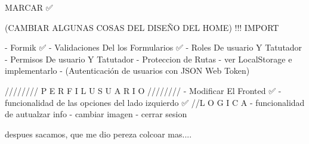
MARCAR ✅

(CAMBIAR ALGUNAS COSAS DEL DISEÑO DEL HOME) !!! IMPORT 

- Formik ✅
- Validaciones Del los Formularios ✅
- Roles De usuario Y Tatutador 
- Permisos De usuario Y Tatutador
- Proteccion de Rutas
- ver LocalStorage e implementarlo
- (Autenticación de usuarios con JSON Web Token)


////////   P E R F I L   U S U A R I O   ////////  
- Modificar El Fronted ✅
- funcionalidad de las opciones del lado izquierdo ✅
//L O G I C A
- funcionalidad de autualzar info 
- cambiar imagen
- cerrar sesion 

despues sacamos, que me dio pereza colcoar mas....


